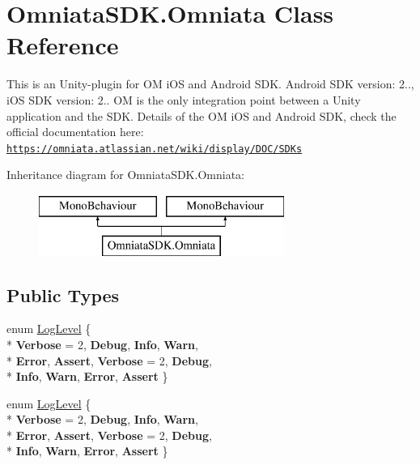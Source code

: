 \hypertarget{class_omniata_s_d_k_1_1_omniata}{\section{Omniata\+S\+D\+K.\+Omniata Class Reference}
\label{class_omniata_s_d_k_1_1_omniata}
}


This is an Unity-\/plugin for O\+M i\+O\+S and Android S\+D\+K. Android S\+D\+K version\+: 2.., i\+O\+S S\+D\+K version\+: 2.. O\+M is the only integration point between a Unity application and the S\+D\+K. Details of the O\+M i\+O\+S and Android S\+D\+K, check the official documentation here\+: \href{https://omniata.atlassian.net/wiki/display/DOC/SDKs}{\tt https\+://omniata.\+atlassian.\+net/wiki/display/\+D\+O\+C/\+S\+D\+Ks}  


Inheritance diagram for Omniata\+S\+D\+K.\+Omniata\+:\begin{figure}[H]
\begin{center}
\leavevmode
\includegraphics[height=2.000000cm]{class_omniata_s_d_k_1_1_omniata}
\end{center}
\end{figure}
\subsection*{Public Types}
\begin{DoxyCompactItemize}
\item 
enum \hyperlink{class_omniata_s_d_k_1_1_omniata_aac4ddf8e7386e787ff7ff8bab48cc6de}{Log\+Level} \{ \\*
{\bfseries Verbose} = 2, 
{\bfseries Debug}, 
{\bfseries Info}, 
{\bfseries Warn}, 
\\*
{\bfseries Error}, 
{\bfseries Assert}, 
{\bfseries Verbose} = 2, 
{\bfseries Debug}, 
\\*
{\bfseries Info}, 
{\bfseries Warn}, 
{\bfseries Error}, 
{\bfseries Assert}
 \}
\item 
enum \hyperlink{class_omniata_s_d_k_1_1_omniata_aac4ddf8e7386e787ff7ff8bab48cc6de}{Log\+Level} \{ \\*
{\bfseries Verbose} = 2, 
{\bfseries Debug}, 
{\bfseries Info}, 
{\bfseries Warn}, 
\\*
{\bfseries Error}, 
{\bfseries Assert}, 
{\bfseries Verbose} = 2, 
{\bfseries Debug}, 
\\*
{\bfseries Info}, 
{\bfseries Warn}, 
{\bfseries Error}, 
{\bfseries Assert}
 \}
\end{DoxyCompactItemize}
